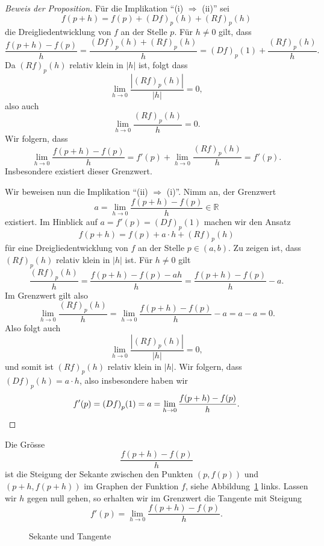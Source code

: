 \documentclass[../main.tex]{subfiles}
\begin{document}
\begin{proof}[Beweis der Proposition]
  Für die Implikation ``(i) $\Rightarrow$ (ii)''
  sei
  \[
    f(p + h) = f(p) + {(Df)}_p(h) + {(Rf)}_p(h)
  \]
  die Dreigliedentwicklung von $f$ an der
  Stelle $p$.
  Für $h \neq 0$ gilt, dass
  \[
    \frac{f(p + h) - f(p)}{h}
    = \frac{{(Df)}_p(h) + {(Rf)}_p(h)}{h}
    ={(Df)}_p(1) + \frac{{(Rf)}_p(h)}{h}.
  \]
  Da ${(Rf)}_p(h)$ relativ klein in $|h|$ ist,
  folgt dass
  \[
    \lim_{h \to 0} \frac{|{(Rf)}_p(h)|}{|h|} = 0,
  \]
  also auch
  \[
    \lim_{h \to 0} \frac{{(Rf)}_p(h)}{h} = 0.
  \]
  Wir folgern, dass
  \[
    \lim_{h \to 0} \frac{f(p + h) - f(p)}{h}
    = f'(p) + \lim_{h \to 0} \frac{{(Rf)}_p(h)}{h} = f'(p).
  \]
  Insbesondere existiert dieser Grenzwert.

  Wir beweisen nun die Implikation
  ``(ii) $\Rightarrow$ (i)''.
  Nimm an, der Grenzwert
  \[
    a = \lim_{h \to 0} \frac{f(p+h) - f(p)}{h} \in \mathbb{R}
  \]
  existiert.
  Im Hinblick auf $a = f'(p) = {(Df)}_p(1)$
  machen wir den Ansatz
  \[
    f(p + h) = f(p) + a \cdot h + {(Rf)}_p(h)
  \]
  für eine Dreigliedentwicklung von $f$ an der Stelle
  $p \in (a, b)$. Zu zeigen ist, dass
  ${(Rf)}_p(h)$ relativ klein in $|h|$ ist.
  Für $h \neq 0$ gilt
  \[
    \frac{{(Rf)}_p(h)}{h} =
    \frac{f(p+h) - f(p) - ah}{h}
    = \frac{f(p+h) - f(p)}{h} - a.
  \]
  Im Grenzwert gilt also
  \[
    \lim_{h \to 0} \frac{{(Rf)}_p(h)}{h}
    = \lim_{h \to 0}
    \frac{f(p + h) - f(p)}{h} - a
    = a - a = 0.
  \]
  Also folgt auch
  \[
    \lim_{h \to 0} \frac{|{(Rf)}_p(h)|}{|h|} = 0,
  \]
  und somit ist ${(Rf)}_p(h)$ relativ klein
  in $|h|$.
  Wir folgern, dass ${(Df)}_p(h) = a \cdot h$,
  also insbesondere haben wir
  \[
    f'(p) = {(Df)}_p(1) = a = 
    \lim_{h \to 0} \frac{f(p + h) - f(p)}{h}. \qedhere
  \]
\end{proof}

\begin{geometric}
  Die Grösse
  \[
    \frac{f(p+h) - f(p)}{h}
  \]
  ist die Steigung der Sekante
  zwischen den Punkten $(p, f(p))$ 
  und $(p + h, f(p+h))$ im Graphen
  der Funktion $f$, siehe Abbildung~\ref{fig:derivative}
  links.
  Lassen wir $h$ gegen null gehen,
  so erhalten wir im Grenzwert die Tangente
  mit Steigung
  \[
    f'(p) = \lim_{h \to 0} \frac{f(p + h) - f(p)}{h}.
  \]
\end{geometric}

\begin{figure}[htb] 
  \centering
  \begin{minipage}{0.4\textwidth}
    \centering
    
  \end{minipage}%
  \begin{minipage}{0.4\textwidth}
    \centering
    
  \end{minipage}%
  \caption{Sekante und Tangente}%
  \label{fig:derivative}
\end{figure}
\end{document}

